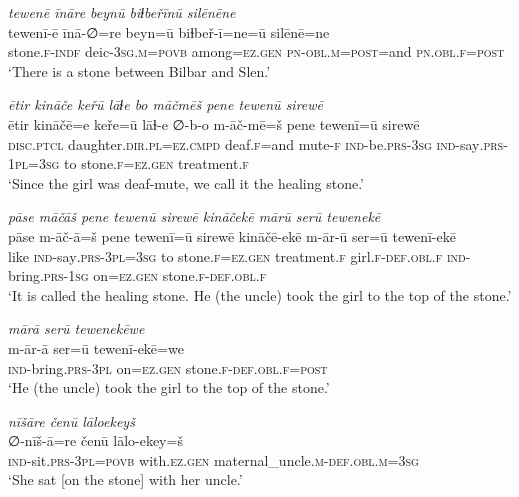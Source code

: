 \ea \label{ZP.50}
\textit{tewenē īnāre beynū biɫbeřīnū silēnēne} \\ 
\gll tewenī-ē īnā-∅=re beyn=ū biɫbeř-ī=ne=ū silēnē=ne \\ 
 stone\textsc{.f}\textsc{-indf} deic\textsc{-3sg}\textsc{.m}\textsc{=\textsc{povb}} among\textsc{\textsc{=ez.gen}} \textsc{pn}\textsc{-obl}\textsc{.m}\textsc{=\textsc{post}}=and \textsc{pn}\textsc{.obl}\textsc{.f}\textsc{=\textsc{post}} \\ 
\glt `There is a stone between Bilbar and Slen.'
\z 
 
\ea \label{ZP.51}
\textit{ētir kināče keřū lāɫe bo māčmēš pene tewenū sirewē} \\ 
\gll ētir kināčē=e keře=ū lāɫ-e ∅-b-o m-āč-mē=š pene tewenī=ū sirewē \\ 
 \textsc{disc.ptcl} daughter\textsc{.dir}\textsc{.pl}\textsc{=ez}\textsc{.cmpd} deaf\textsc{.f}=and mute\textsc{-f} \textsc{ind-}be\textsc{.prs}\textsc{-3sg} \textsc{ind-}say\textsc{.prs}\textsc{-1pl}\textsc{=3sg} to stone\textsc{.f}\textsc{\textsc{=ez.gen}} treatment\textsc{.f} \\ 
\glt `Since the girl was deaf-mute, we call it the healing stone.'
\z 
 
\ea \label{ZP.52}
\textit{pāse māčāš pene tewenū sirewē kināčekē mārū serū tewenekē} \\ 
\gll pāse m-āč-ā=š pene tewenī=ū sirewē kināčē-ekē m-ār-ū ser=ū tewenī-ekē \\ 
 like \textsc{ind-}say\textsc{.prs}\textsc{-3pl}\textsc{=3sg} to stone\textsc{.f}\textsc{\textsc{=ez.gen}} treatment\textsc{.f} girl\textsc{.f}\textsc{-def}\textsc{.obl}\textsc{.f} \textsc{ind-}bring\textsc{.prs}\textsc{-\textsc{1sg}} on\textsc{\textsc{=ez.gen}} stone\textsc{.f}\textsc{-def}\textsc{.obl}\textsc{.f} \\ 
\glt `It is called the healing stone. He (the uncle) took the girl to the top of the stone.'
\z 
 
\ea \label{ZP.55}
\textit{mārā serū tewenekēwe} \\ 
\gll m-ār-ā ser=ū tewenī-ekē=we \\ 
 \textsc{ind-}bring\textsc{.prs}\textsc{-3pl} on\textsc{\textsc{=ez.gen}} stone\textsc{.f}\textsc{-def}\textsc{.obl}\textsc{.f}\textsc{=\textsc{post}} \\ 
\glt `He (the uncle) took the girl to the top of the stone.'
\z 
 
\ea \label{ZP.56}
\textit{nīšāre čenū lāloekeyš} \\ 
\gll ∅-nīš-ā=re čenū lālo-ekey=š \\ 
 \textsc{ind-}sit\textsc{.prs}\textsc{-3pl}\textsc{=\textsc{povb}} with\textsc{.ez.gen} maternal\_uncle\textsc{.m}\textsc{-def}\textsc{.obl}\textsc{.m}\textsc{=3sg} \\ 
\glt `She sat [on the stone] with her uncle.'
\z 
 
